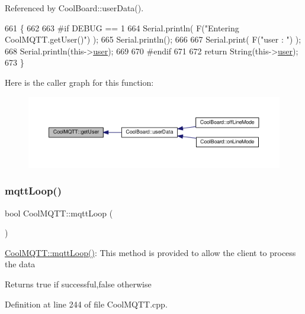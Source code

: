 Referenced by Cool\+Board\+::user\+Data().


\begin{DoxyCode}
661 \{
662 
663 \textcolor{preprocessor}{#if DEBUG == 1 }
664     Serial.println( F(\textcolor{stringliteral}{"Entering CoolMQTT.getUser()"}) );
665     Serial.println();
666     
667     Serial.print( F(\textcolor{stringliteral}{"user : "}) );
668     Serial.println(this->\hyperlink{classCoolMQTT_a8cd47e45d457f908d4b4390b35aaee83}{user});
669 
670 \textcolor{preprocessor}{#endif}
671 
672     \textcolor{keywordflow}{return} String(this->\hyperlink{classCoolMQTT_a8cd47e45d457f908d4b4390b35aaee83}{user});
673 \}
\end{DoxyCode}
Here is the caller graph for this function\+:
\nopagebreak
\begin{figure}[H]
\begin{center}
\leavevmode
\includegraphics[width=350pt]{classCoolMQTT_a373cc92fca7760d886f02d8a6e5b3f63_icgraph}
\end{center}
\end{figure}
\mbox{\label{classCoolMQTT_aa5eaae967b562b62cbcf2b8d81f6e5d5}} 
\subsubsection{\texorpdfstring{mqtt\+Loop()}{mqttLoop()}}
{\footnotesize\ttfamily bool Cool\+M\+Q\+T\+T\+::mqtt\+Loop (\begin{DoxyParamCaption}{ }\end{DoxyParamCaption})}

\hyperlink{classCoolMQTT_aa5eaae967b562b62cbcf2b8d81f6e5d5}{Cool\+M\+Q\+T\+T\+::mqtt\+Loop()}\+: This method is provided to allow the client to process the data

\begin{DoxyReturn}{Returns}
true if successful,false otherwise 
\end{DoxyReturn}


Definition at line 244 of file Cool\+M\+Q\+T\+T.\+cpp.



